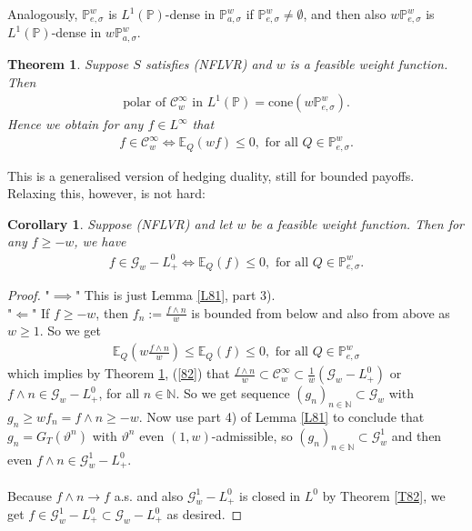 \documentclass[12pt,a4paper, twoside]{article}
\newtheorem{thm}{Theorem}[section]
\newtheorem{cor}{Corollary}[section]
\theoremstyle{definition}
\newcommand{\EE}{\mathbb{E}} %
\newcommand{\PP}{\mathbb{P}} %
\begin{document}
\noindent Analogously, $\PP_{e, \sigma}^w$ is $L^1(\PP)$-dense in $\PP_{a, \sigma}^w$ if $\PP_{e,\sigma}^w \neq \emptyset$, and then also $w\PP_{e, \sigma}^w$ is $L^1(\PP)$-dense in $w\PP_{a, \sigma}^w$. 
\begin{thm} \label{T84} Suppose $S$ satisfies (NFLVR) and $w$ is a feasible weight function. Then 
\begin{align*} \label{81}
\text{polar of $\mathcal{C}_w^\infty$ in }L^1( \PP)=\text{cone}(w \PP_{e, \sigma}^w). \tag{9.1}
\end{align*}
Hence we obtain for any $f \in L^\infty$ that 
\begin{align*} \label{82}
f \in \mathcal{C}_w^\infty \iff \EE_Q(wf) \leq 0, \text{ for all } Q \in \PP_{e, \sigma}^w. \tag{9.2}
\end{align*}
\end{thm}
\newpage
This is a generalised version of hedging duality, still for bounded payoffs. Relaxing this, however, is not hard:
\begin{cor} \label{C85} Suppose (NFLVR) and let $w$ be a feasible weight function. Then for any $f \geq -w$, we have 
\begin{align*}
f \in \mathcal{G}_w-L_+^0 \iff \EE_Q(f) \leq 0, \text{ for all } Q \in \PP_{e, \sigma}^w.
\end{align*}
\end{cor}
\begin{proof}
"$\implies$" This is just Lemma \ref{L81}, part 3). \\
"$\Longleftarrow$" If $f \geq -w$, then $f_n := \frac{f \wedge n}{w}$ is bounded from below and also from above as $w \geq 1$. So we get 
\begin{align*}
\EE_Q\left( w \frac{f \wedge n}{w} \right) \leq \EE_Q(f) \leq 0, \text{ for all } Q \in \PP_{e, \sigma}^w
\end{align*}
which implies by Theorem \ref{T84}, (\ref{82}) that $\frac{f \wedge n}{w} \subset \mathcal{C}_w^\infty \subset \frac{1}{w}( \mathcal{G}_w - L_+^0)$ or $f \wedge n \in \mathcal{G}_w - L_+^0$, for all $n \in \mathbb{N}$. So we get sequence $(g_n)_{n \in \mathbb{N}} \subset \mathcal{G}_w$ with $g_n \geq w f_n = f \wedge n \geq -w$. Now use part 4) of Lemma \ref{L81} to conclude that $g_n = G_T( \vartheta^n)$ with $\vartheta^n$ even $(1,w)$-admissible, so $(g_n)_{n \in \mathbb{N}} \subset \mathcal{G}_w^1$ and then even $f \wedge n \in \mathcal{G}_w^1 - L_+^0$. 
\\\\
Because $f \wedge n \to f$ a.s. and also $\mathcal{G}_w^1- L_+^0$ is closed in $L^0$ by Theorem \ref{T82}, we get $f \in \mathcal{G}_w^1-L_+^0 \subset \mathcal{G}_w- L_+^0$ as desired. 
\end{proof}
\end{document}
